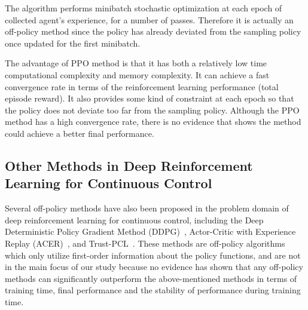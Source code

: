 The algorithm performs minibatch stochastic optimization at each epoch of collected agent's experience, for a number of passes. Therefore it is actually an off-policy method since the policy has already deviated from the sampling policy once updated for the first minibatch.

The advantage of PPO method is that it has both a relatively low time computational complexity and memory complexity. It can achieve a fast convergence rate in terms of the reinforcement learning performance (total episode reward). It also provides some kind of constraint at each epoch so that the policy does not deviate too far from the sampling policy. Although the PPO method has a high convergence rate, there is no evidence that shows the method could achieve a better final performance.
\subsection{Other Methods in Deep Reinforcement Learning for Continuous Control}
Several off-policy methods have also been proposed in the problem domain of deep reinforcement learning for continuous control, including the Deep Deterministic Policy Gradient Method (DDPG)~\cite{lillicrap2015continuous}, Actor-Critic with Experience Replay (ACER)~\cite{wang2016sample}, and Trust-PCL~\cite{nachum2017trust}. These methods are off-policy algorithms which only utilize first-order information about the policy functions, and are not in the main focus of our study because no evidence has shown that any off-policy methods can significantly outperform the above-mentioned methods in terms of training time, final performance and the stability of performance during training time.
